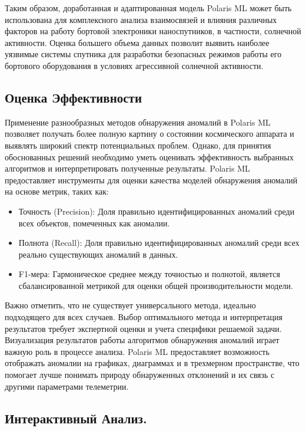 \documentclass[14pt, a4paper]{extreport}
\begin{document}
    Таким образом, доработанная и адаптированная модель Polaris ML может быть использована для комплексного анализа взаимосвязей и влияния различных факторов на работу бортовой электроники наноспутников, в частности, солнечной активности.
    Оценка большего объема данных позволит выявить наиболее уязвимые системы спутника для разработки безопасных режимов работы его бортового оборудования в условиях агрессивной солнечной активности.

    \subsection{Оценка Эффективности}
    Применение разнообразных методов обнаружения аномалий в Polaris ML позволяет получать более полную картину о состоянии космического аппарата и выявлять широкий спектр потенциальных проблем. Однако, для принятия обоснованных решений необходимо уметь оценивать эффективность выбранных алгоритмов и интерпретировать полученные результаты.
    Polaris ML предоставляет инструменты для оценки качества моделей обнаружения аномалий на основе метрик, таких как:

    \begin{itemize}
        \item Точность (Precision): Доля правильно идентифицированных аномалий среди всех объектов, помеченных как аномалии.
        \item Полнота (Recall): Доля правильно идентифицированных аномалий среди всех реально существующих аномалий в данных.
        \item F1-мера: Гармоническое среднее между точностью и полнотой, является сбалансированной метрикой для оценки общей производительности модели.
    \end{itemize}

    Важно отметить, что не существует универсального метода, идеально подходящего для всех случаев.
    Выбор оптимального метода и интерпретация результатов требует экспертной оценки и учета специфики решаемой задачи.
    Визуализация результатов работы алгоритмов обнаружения аномалий играет важную роль в процессе анализа.
    Polaris ML предоставляет возможность отображать аномалии на графиках, диаграммах и в трехмерном пространстве, что помогает лучше понимать природу обнаруженных отклонений и их связь с другими параметрами телеметрии.

    \subsection{Интерактивный Анализ.}
\end{document}
